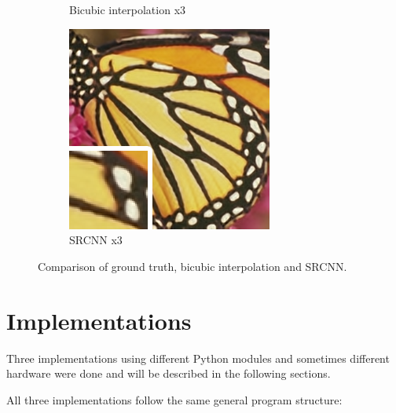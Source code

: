 \documentclass[
			fontsize = 12pt,
			paper = a4
			]
			{scrartcl}%
\newcommand{\?}{\ensuremath{^\texttt{\textbf [CITATION~NEEDED]}}}
\begin{document}
\begin{figure}[!hbt]
\begin{subfigure}[b]{0.3\textwidth}
         \caption{Bicubic interpolation x3}
     \end{subfigure}
     \hfill
     \begin{subfigure}[b]{0.3\textwidth}
         \centering
         \includegraphics[width=\textwidth]{fig/examples/butterfly_srcnn_x3}
         \caption{SRCNN x3}
     \end{subfigure}
        \caption{Comparison of ground truth, bicubic interpolation and SRCNN.}
        \label{fig:srexample}
\end{figure}


\newpage

\section{Implementations}
\label{sec:Implementation}

Three implementations using different Python modules and sometimes different hardware were done and will be described in the following sections.

All three implementations follow the same general program structure:
\end{document}
